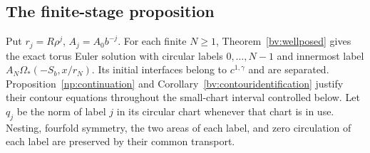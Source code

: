 \documentclass[11pt]{amsart}
\theoremstyle{remark}
\numberwithin{equation}{section}
\begin{document}
\subsection{The finite-stage proposition}
Put $r_j=R\rho^j$, $A_j=A_0b^{-j}$. For each finite $N\ge1$, Theorem~\ref{bv:wellposed} gives the exact torus Euler solution with circular labels $0,\ldots,N-1$ and innermost label $A_N\Omega_*(-S_b,x/r_N)$. Its initial interfaces belong to $c^{1,\gamma}$ and are separated. Proposition~\ref{np:continuation} and Corollary~\ref{bv:contouridentification} justify their contour equations throughout the small-chart interval controlled below. Let $q_j$ be the norm of label $j$ in its circular chart whenever that chart is in use. Nesting, fourfold symmetry, the two areas of each label, and zero circulation of each label are preserved by their common transport.
\end{document}
